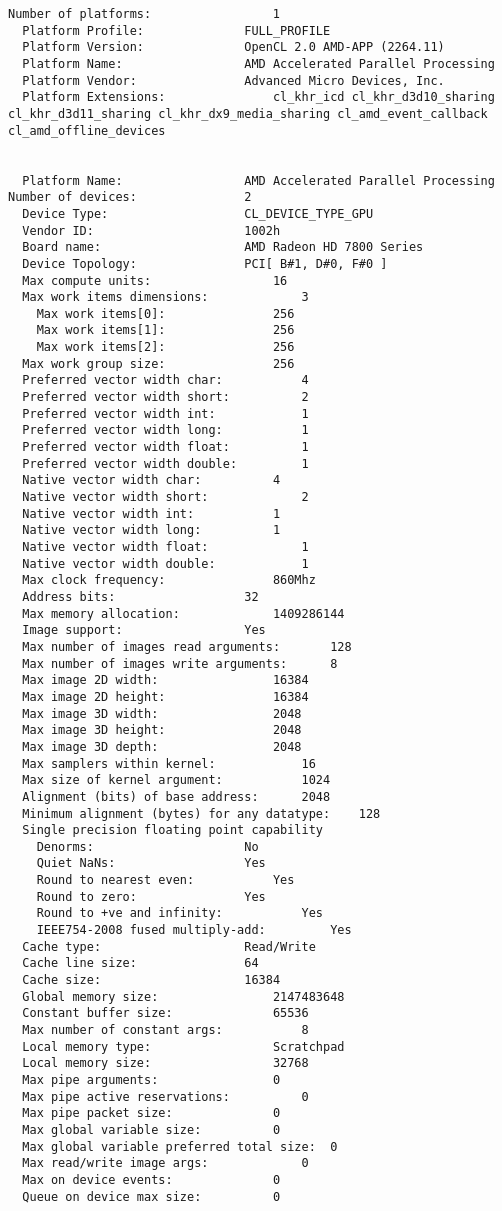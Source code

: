 \documentclass[12pt]{article}
\begin{document}
\begin{lstlisting}
Number of platforms:				 1
  Platform Profile:				 FULL_PROFILE
  Platform Version:				 OpenCL 2.0 AMD-APP (2264.11)
  Platform Name:				 AMD Accelerated Parallel Processing
  Platform Vendor:				 Advanced Micro Devices, Inc.
  Platform Extensions:				 cl_khr_icd cl_khr_d3d10_sharing cl_khr_d3d11_sharing cl_khr_dx9_media_sharing cl_amd_event_callback cl_amd_offline_devices 


  Platform Name:				 AMD Accelerated Parallel Processing
Number of devices:				 2
  Device Type:					 CL_DEVICE_TYPE_GPU
  Vendor ID:					 1002h
  Board name:					 AMD Radeon HD 7800 Series
  Device Topology:				 PCI[ B#1, D#0, F#0 ]
  Max compute units:				 16
  Max work items dimensions:			 3
    Max work items[0]:				 256
    Max work items[1]:				 256
    Max work items[2]:				 256
  Max work group size:				 256
  Preferred vector width char:			 4
  Preferred vector width short:			 2
  Preferred vector width int:			 1
  Preferred vector width long:			 1
  Preferred vector width float:			 1
  Preferred vector width double:		 1
  Native vector width char:			 4
  Native vector width short:			 2
  Native vector width int:			 1
  Native vector width long:			 1
  Native vector width float:			 1
  Native vector width double:			 1
  Max clock frequency:				 860Mhz
  Address bits:					 32
  Max memory allocation:			 1409286144
  Image support:				 Yes
  Max number of images read arguments:		 128
  Max number of images write arguments:		 8
  Max image 2D width:				 16384
  Max image 2D height:				 16384
  Max image 3D width:				 2048
  Max image 3D height:				 2048
  Max image 3D depth:				 2048
  Max samplers within kernel:			 16
  Max size of kernel argument:			 1024
  Alignment (bits) of base address:		 2048
  Minimum alignment (bytes) for any datatype:	 128
  Single precision floating point capability
    Denorms:					 No
    Quiet NaNs:					 Yes
    Round to nearest even:			 Yes
    Round to zero:				 Yes
    Round to +ve and infinity:			 Yes
    IEEE754-2008 fused multiply-add:		 Yes
  Cache type:					 Read/Write
  Cache line size:				 64
  Cache size:					 16384
  Global memory size:				 2147483648
  Constant buffer size:				 65536
  Max number of constant args:			 8
  Local memory type:				 Scratchpad
  Local memory size:				 32768
  Max pipe arguments:				 0
  Max pipe active reservations:			 0
  Max pipe packet size:				 0
  Max global variable size:			 0
  Max global variable preferred total size:	 0
  Max read/write image args:			 0
  Max on device events:				 0
  Queue on device max size:			 0

\end{lstlisting}
\end{document}
